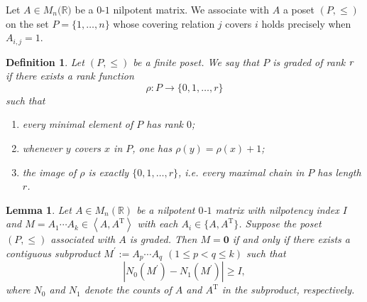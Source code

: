\documentclass[reqno]{amsart}
\theoremstyle{plain}
\newtheorem{definition}{Definition}
\newtheorem{lemma}{Lemma}
\numberwithin{equation}{section}
\begin{document}
Let $A\in M_{n}(\mathbb{R)}$ be a $0$-$1$ nilpotent matrix. We associate
with $A$ a poset $(P,\leq )$ on the set $P=\{{1,\ldots ,n\}}$ whose covering
relation $j$ covers $i$ holds precisely when $A_{i,j}=1.$

\begin{definition}
Let $(P,\leq )$ be a finite poset. We say that $P$ is \emph{graded of rank }$%
\emph{r}$ if there exists a rank function 
\begin{equation*}
\rho :P\longrightarrow \{0,1,\dots ,r\}
\end{equation*}%
such that

\begin{enumerate}
\item[(i)] every minimal element of $P$ has rank $0$;

\item[(ii)] whenever $y$ covers $x$ in $P$, one has $\rho (y)=\rho (x)+1$;

\item[(iii)] the image of $\rho $ is exactly $\{0,1,\dots ,r\}$, i.e. every
maximal chain in $P$ has length $r$.
\end{enumerate}
\end{definition}

\begin{lemma}
\label{le-SN}Let $A\in M_{n}(\mathbb{R})$ be a nilpotent $0$-$1$ matrix with
nilpotency index $I$ and $M=A_{1}\cdots A_{k}\in \left\langle A,A^{\mathrm{T}%
}\right\rangle $ with each $A_{i}\in \{A,A^{\mathrm{T}}\}$. Suppose the
poset $(P,\leq )$ associated with $A$ is graded. Then $M=\boldsymbol{0}$ if
and only if there exists a contiguous subproduct $M^{\prime }:=A_{p}\cdots
A_{q}$ $(1\leq p<q\leq k)$ such that 
\begin{equation*}
\left\vert N_{0}(M^{\prime })-N_{1}(M^{\prime })\right\vert \geq I,
\end{equation*}%
where $N_{0}$ and $N_{1}$ denote the counts of $A$ and $A^{\mathrm{T}}$ in
the subproduct, respectively.
\end{lemma}
\end{document}
